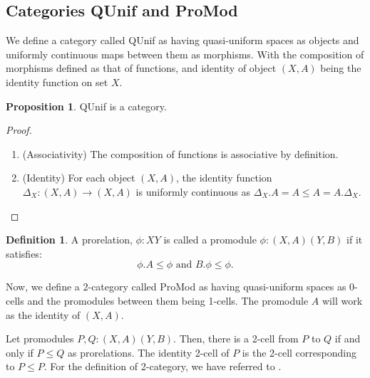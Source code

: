 \documentclass[a4paper]{article}
\makeatletter
\theoremstyle{definition}
\newtheorem{definition}[theorem]{Definition}
\newtheorem{prop}[theorem]{Proposition}
\newcommand{\carrow}{}%
\DeclareRobustCommand{\carrow}{%
	\mathrel{\vphantom{\rightarrow}\mathpalette\circle@arrow\relax}%
}
\newcommand{\circle@arrow}[2]{%
	\m@th
	\ooalign{%
		\hidewidth$#1\circ\mkern1mu$\hidewidth\cr
	$#1\longrightarrow$\cr}%
}
\makeatother
\begin{document}
			\subsection{Categories QUnif and ProMod}
			We define a category called QUnif as having quasi-uniform spaces as objects
			and uniformly continuous maps between them as morphisms.
			With the composition of morphisms defined as that of functions,
			and identity of object $(X,A)$ being the identity function on set $X$.
			\begin{prop} QUnif is a category.\end{prop}
			\begin{proof}\setcounter{equation}{0}
				\begin{enumerate}[label=(\roman*)]
					\item (Associativity) The composition of functions is associative by definition.
					\item (Identity) For each object $(X,A)$, the identity function
						$\Delta_X:(X,A) \to (X,A)$ is uniformly continuous as
						$\Delta_X.A=A \leq A=A.\Delta_X$.
						\qedhere
				\end{enumerate}
			\end{proof}
			\begin{definition}%
				A prorelation, $\phi:X \carrow Y$ is called a promodule $\phi: (X,A) \carrow (Y,B)$  if it
				satisfies:
				\[ \phi.A \leq \phi \text{ and } B. \phi \leq \phi .\]
			\end{definition}

			Now, we define a 2-category called ProMod as having quasi-uniform spaces as 0-cells and the
			promodules between them being 1-cells.
			The promodule $A$ will work as the identity of $(X,A)$.

			Let promodules $P,Q: (X,A) \carrow (Y,B)$. Then, there
			is a 2-cell from $P$ to $Q$ if and only if $P \leq Q$ as prorelations.
			The identity 2-cell of $P$ is the 2-cell corresponding to $P\leq P$.
			For the definition of 2-category, we have referred to \cite{Riehl_2016}.
\end{document}
